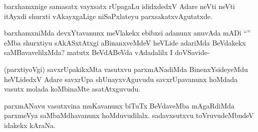 
\begin{artha}
barxhamxnige samasatx vayxsatx rUpagaLu ididxdedxV Adare neVti neVti itAyxdi shurxti vAkayxgaLige niSaPxlateyu parxsakatxvAgutatxde.
\end{artha}


\begin{artha}
barxhamxniMda devxYtavanunx meVlakekx ebibxsi adanunx anuvAda mADi ``\stext'' eMba shurxtiyu sAkASxtAtxgi aBinanxveMdeV heVLide adariMda BeVdakekx saMBavavelilxMda? matutx BeVdABeVda vAdadalilx I doVSavide-
\end{artha}

\begin{artha}
(parxtiyoVgi) savxrUpakikxMta vasutxvu parxmANadiMda BinenxYsideyeMdu heVLidedxV Adare savxrUpa shUnayxvAguvudu savxrUpavanunx hoMdada vasutx molada koMbinaMte asatAtxguvudu.
\end{artha}


\begin{artha}
parxmANavu vasutxvina muKavanunx biTuTx BeVdaveMba mAgaRdiMda parxmeVya saMbaMdhavanunx hoMduvudilalx. sadavxsutxvu toVruvudeMbudeV idakekx kAraNa.
\end{artha} 


